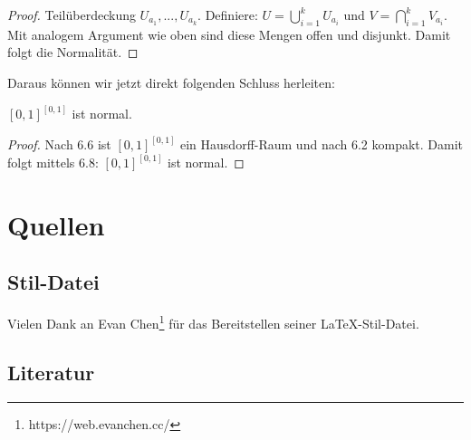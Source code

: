 \documentclass[11pt]{scrartcl}
\begin{document}
{\begin{proof}
	Teilüberdeckung $U_{a_1},...,U_{a_k}$. Definiere: $U= \bigcup_{i=1}^k U_{a_i}$ und $V= \bigcap_{i=1}^k V_{a_i}$. Mit analogem Argument wie oben sind diese Mengen offen und disjunkt. Damit folgt die
	Normalität.
\end{proof}
Daraus können wir jetzt direkt folgenden Schluss herleiten:
\begin{theorem}
	$[0,1]^{[0,1]}$ ist normal.
\end{theorem}
\begin{proof}
	Nach 6.6 ist $[0,1]^{[0,1]}$ ein Hausdorff-Raum und nach 6.2 kompakt. Damit folgt mittels 6.8: $[0,1]^{[0,1]}$ ist normal.
\end{proof}
}
\section{Quellen}
\subsection{Stil-Datei}
Vielen Dank an Evan Chen\footnote{https://web.evanchen.cc/} für das Bereitstellen seiner \LaTeX-Stil-Datei.
\subsection{Literatur}
\printbibliography[heading=none]
\end{document}
